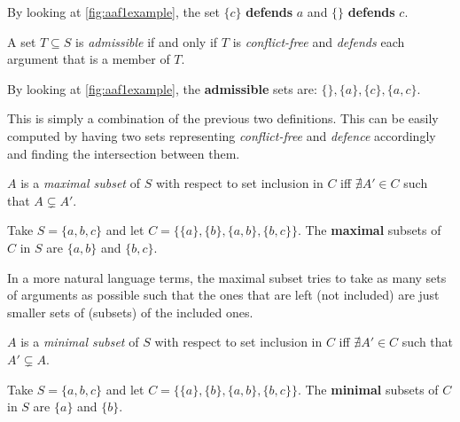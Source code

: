            \begin{exa}
                By looking at \autoref{fig:aaf1example}, the set $\{c\}$ \textbf{defends} $a$ and $\{\}$ \textbf{defends} $c$.
                \label{exa:example3}
            \end{exa}
            
            \begin{definition}
                A set $T \subseteq S$ is \textit{admissible} if and only if $T$ is \textit{conflict-free} and \textit{defends} each argument that is a member of $T$.
                \label{definition:definition4}
            \end{definition}
            
            \begin{exa}
                By looking at \autoref{fig:aaf1example}, the \textbf{admissible} sets are:  $\{\}, \{a\}, \{c\}, \{a, c\}$.
                \label{exa:example4}
            \end{exa}
            
            This is simply a combination of the previous two definitions. This can be easily computed by having two sets representing \textit{conflict-free} and \textit{defence} accordingly and finding the intersection between them.
            
            \begin{definition}
                $A$ is a \textit{maximal subset} of $S$ with respect to set inclusion in $C$ iff $\nexists A' \in C$ such that $A \subsetneq A'$.
                \label{definition:definition5}
            \end{definition}
            \begin{exa}
                Take $S = \{a, b, c\}$ and let $C = \{\{a\}, \{b\}, \{a, b\}, \{b, c\}\}$. The \textbf{maximal} subsets of $C$ in $S$ are $\{a, b\}$ and $\{b, c\}$.
                \label{exa:example5}
            \end{exa}
            
            In a more natural language terms, the maximal subset tries to take as many sets of arguments as possible such that the ones that are left (not included) are just smaller sets of (subsets) of the included ones.
            
            \begin{definition}
                $A$ is a \textit{minimal subset} of $S$ with respect to set inclusion in $C$ iff $\nexists A' \in C$ such that $A' \subsetneq A$.
                \label{definition:definition6}
            \end{definition}
            \begin{exa}
                Take $S = \{a, b, c\}$ and let $C = \{\{a\}, \{b\}, \{a, b\}, \{b, c\}\}$. The \textbf{minimal} subsets of $C$ in $S$ are $\{a\}$ and $\{b\}$.
                \label{exa:example6}
            \end{exa}
            
